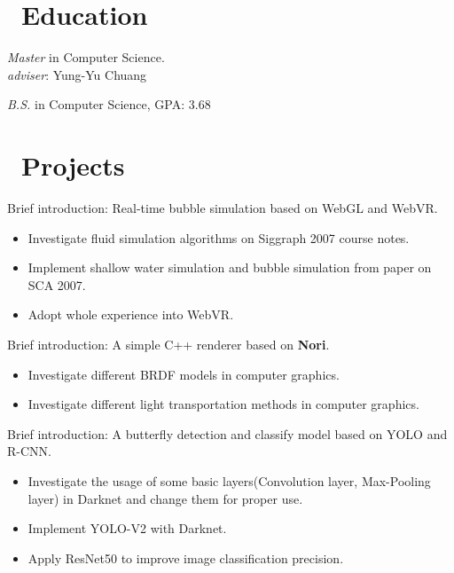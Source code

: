 \documentclass{resume}
\begin{document}



\section{\faGraduationCap\ Education}
\textit{Master} in Computer Science. \\
\textit{adviser}: Yung-Yu Chuang

\textit{B.S.} in Computer Science, GPA: 3.68

\section{\faUsers\ Projects}

Brief introduction: Real-time bubble simulation based on WebGL and WebVR.
\begin{itemize}
    \item Investigate fluid simulation algorithms on Siggraph 2007 course notes.
    \item Implement shallow water simulation and bubble simulation from paper on SCA 2007.
    \item Adopt whole experience into WebVR.
\end{itemize}

Brief introduction: A simple C++ renderer based on \textbf{Nori}.
\begin{itemize}
    \item Investigate different BRDF models in computer graphics.
    \item Investigate different light transportation methods in computer graphics.
\end{itemize}

Brief introduction: A butterfly detection and classify model based on YOLO and R-CNN.
\begin{itemize}
	\item Investigate the usage of some basic layers(Convolution layer, Max-Pooling layer) in Darknet and change them for proper use.
  \item Implement YOLO-V2 with Darknet.
	\item Apply ResNet50 to improve image classification precision.
\end{itemize}
\end{document}
